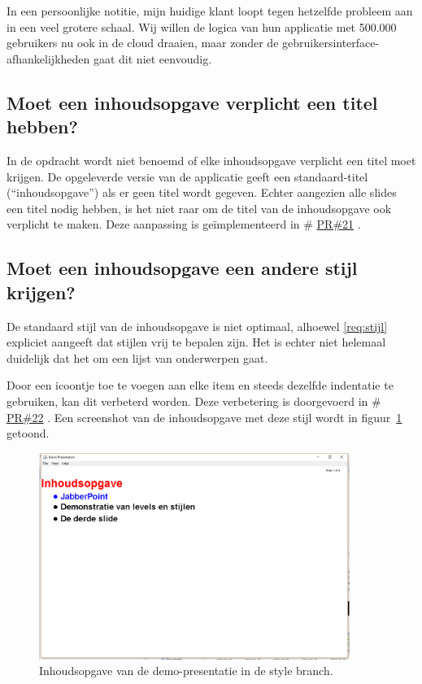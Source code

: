 \documentclass[a4paper]{article}
\makeatletter
\newcommand*{\repo}{\begingroup\@makeother\#\@repo}
\newcommand*{\@repo}[2]{%
  \href{https://github.com/DanielSchiavini/design-patterns-assignment/#1}{#2}%
  \endgroup}
\newcommand{\PR}[1]{\repo{pull/#1}{PR\##1}}
\newcommand{\reqref}[1]{\ref{req:#1}}
\newcommand{\question}[1]{
  \subsection{#1}
}
\makeatother
\begin{document}
    In een persoonlijke notitie, mijn huidige klant loopt tegen hetzelfde pro\-bleem aan in een veel grotere schaal.
    Wij willen de logica van hun applicatie met 500.000 gebruikers nu ook in de cloud draaien, maar zonder de ge\-bruik\-ers\-inter\-face-afhankelijkheden gaat dit niet eenvoudig.

    \question{Moet een inhoudsopgave verplicht een titel hebben?}
    In de opdracht wordt niet benoemd of elke inhoudsopgave verplicht een titel moet krijgen.
    De opgeleverde versie van de applicatie geeft een standaard-titel (``inhoudsopgave'') als er geen titel wordt gegeven.
    Echter aangezien alle slides een titel nodig hebben, is het niet raar om de titel van de inhoudsopgave ook verplicht te maken.
    Deze aanpassing is geïmplementeerd in \PR{21}.
    
    \question{Moet een inhoudsopgave een andere stijl krijgen?}
    De standaard stijl van de inhoudsopgave is niet optimaal, alhoewel \reqref{stijl} expliciet aangeeft dat stijlen vrij te bepalen zijn.
    Het is echter niet helemaal duidelijk dat het om een lijst van onderwerpen gaat.
    
    Door een icoontje toe te voegen aan elke item en steeds dezelfde indentatie te gebruiken, kan dit verbeterd worden.
    Deze verbetering is doorgevoerd in \PR{22}.
    Een screenshot van de inhoudsopgave met deze stijl wordt in figuur~\ref{fig:style} getoond.
    \begin{figure}[!htb]
     \caption{
        Inhoudsopgave van de demo-presentatie in de style branch.\label{fig:style}
     }
     \centering \includegraphics[width=0.9\textwidth]{Screenshots/style.png}
    \end{figure}
\end{document}
